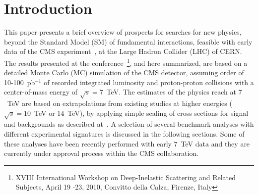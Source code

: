 \documentclass{cmspaper}
\begin{document}
\section{Introduction}
This paper presents a brief overview of prospects for searches for new physics, 
beyond the Standard Model (SM) of fundamental interactions, feasible with early data of the 
CMS experiment~\cite{Bayatian:2006zz}, at the Large Hadron Collider (LHC) of CERN.
The results presented at the conference~\footnote{XVIII International Workshop on Deep-Inelastic Scattering and Related Subjects, 
April 19 -23, 2010, Convitto della Calza, Firenze, Italy}, and here summarized, 
are based on a detailed Monte Carlo (MC) simulation of 
the CMS detector, assuming order of 10-100~pb$^{-1}$ 
of recorded integrated luminosity and proton-proton collisions 
with a center-of-mass energy of $\sqrt{s} = 7$~TeV. 
The estimates of the physics reach at $7$~TeV are based on extrapolations from existing studies 
at higher energies ($\sqrt{s} = 10$~TeV or $14$~TeV), 
by applying simple scaling of cross sections for signal and backgrounds as described 
at~\cite{CMSPhysicsReach7TeV}. A selection of several benchmark analyses with different experimental 
signatures is discussed in the following sections.
Some of these analyses have been recently performed with early $7$~TeV data 
and they are currently under approval process within the CMS collaboration.
\end{document}
